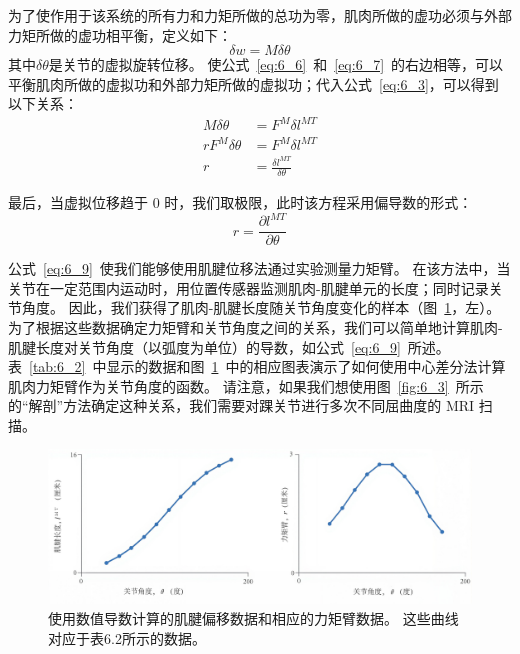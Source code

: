 为了使作用于该系统的所有力和力矩所做的总功为零，肌肉所做的虚功必须与外部力矩所做的虚功相平衡，定义如下：
%
\begin{equation}
	\delta w = M \delta \theta
	\label{eq:6_7}
\end{equation}
%
其中$\delta \theta$是关节的虚拟旋转位移。
使公式~\ref{eq:6_6}~和~\ref{eq:6_7}~的右边相等，可以平衡肌肉所做的虚拟功和外部力矩所做的虚拟功；代入公式~\ref{eq:6_3}，可以得到以下关系：
%
\begin{equation}
	\begin{aligned}
		M \delta \theta & = F^M \delta l^{MT} \\
		r F^M \delta \theta & = F^M \delta l^{MT} \\
		r & = \frac{\delta l^{MT}}{\delta \theta}
	\end{aligned}
	\label{eq:6_8}
\end{equation}


最后，当虚拟位移趋于 0 时，我们取极限，此时该方程采用偏导数的形式：
%
\begin{equation}
	r = \frac{\partial l^{MT}}{\partial \theta}
	\label{eq:6_9}
\end{equation}

公式~\ref{eq:6_9}~使我们能够使用肌腱位移法通过实验测量力矩臂。
在该方法中，当关节在一定范围内运动时，用位置传感器监测肌肉-肌腱单元的长度；同时记录关节角度。
因此，我们获得了肌肉-肌腱长度随关节角度变化的样本（图~\ref{fig:6_5}，左）。
为了根据这些数据确定力矩臂和关节角度之间的关系，我们可以简单地计算肌肉-肌腱长度对关节角度（以弧度为单位）的导数，如公式~\ref{eq:6_9}~所述。
表~\ref{tab:6_2}~中显示的数据和图~\ref{fig:6_5}~中的相应图表演示了如何使用中心差分法计算肌肉力矩臂作为关节角度的函数。
请注意，如果我们想使用图~\ref{fig:6_3}~所示的“解剖”方法确定这种关系，我们需要对踝关节进行多次不同屈曲度的 MRI 扫描。


\begin{figure}[!htb]
	\centering
	\includegraphics[width=1.0\linewidth]{chap6/6_5}
	\caption{使用数值导数计算的肌腱偏移数据和相应的力矩臂数据。
		这些曲线对应于表6.2所示的数据。 \label{fig:6_5}}
\end{figure}


